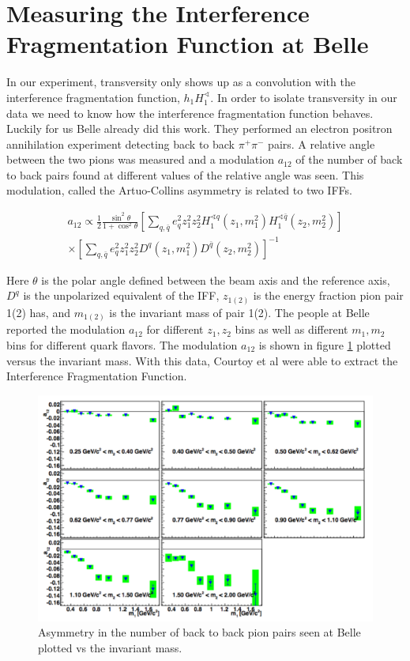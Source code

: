 \documentclass[abstract = on,listof=totoc, bibliography=totoc]{scrreprt}
\begin{document}
\section{Measuring the Interference Fragmentation Function at Belle}

In our experiment, transversity only shows up as a convolution with the interference fragmentation function, $h_1H_1^\sphericalangle$. In order to isolate transversity in our data we need to know how the interference fragmentation function behaves. Luckily for us Belle already did this work\cite{belleIFF}. They performed an electron positron annihilation experiment detecting back to back $\pi^+\pi^-$ pairs. A relative angle between the two pions was measured and a modulation $a_{12}$ of the number of back to back pairs found at different values of the relative angle was seen. This modulation, called the Artuo-Collins asymmetry is related to two IFFs. 
     
\begin{multline}
a_{12} \propto \frac{1}{2} \frac{\sin^2\theta}{1+\cos^2\theta} \left[ \sum_{q,\bar{q}}e_q^2z_1^2z_2^2H_1^{\sphericalangle q}(z_1, m_1^2)H_1^{\sphericalangle \bar{q}}(z_2, m_2^2)\right] \\ \times \left[ \sum_{q,\bar{q}}e_q^2z_1^2z_2^2D^{q}(z_1, m_1^2)D^{\bar{q}}(z_2, m_2^2)\right]^{-1}
\label{eq:A-Casym}
\end{multline}

Here $\theta$ is the polar angle defined between the beam axis and the reference axis, $D^q$ is the unpolarized equivalent of the IFF, $z_{1(2)}$ is the energy fraction pion pair 1(2) has, and $m_{1(2)}$ is the invariant mass of pair 1(2). The people at Belle reported the modulation $a_{12}$ for different $z_1,z_2$ bins as well as different $m_1,m_2$ bins for different quark flavors. The modulation $a_{12}$ is shown in figure \ref{fig:BelleMod} plotted versus the invariant mass. With this data, Courtoy et al were able to extract the Interference Fragmentation Function.\cite{extractIFF}

 \begin{figure}
\begin{center}
\includegraphics[width = .7\textwidth]{BelleAnnModulationM}
\caption[Asymmetry seen in $e^-e^+$ annihilation at Belle]{Asymmetry in the number of back to back pion pairs seen at Belle plotted vs the invariant mass.}
\label{fig:BelleMod}
\end{center}
\end{figure}
\end{document}
